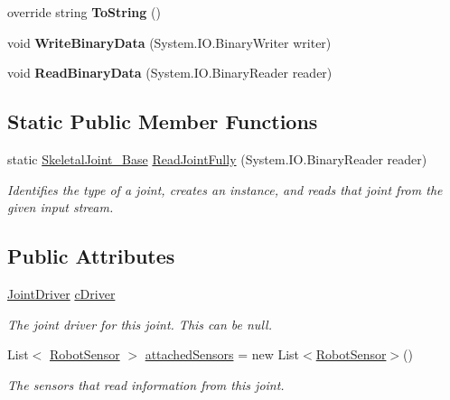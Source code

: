 \begin{DoxyCompactItemize}
\mbox{\label{class_skeletal_joint___base_a0bf3f7cc69c3965e7f3beecc14bec4d0}} 
override string {\bfseries To\+String} ()
\item 
\mbox{\label{class_skeletal_joint___base_a33a745c57346c6d67c52a7ad61816a09}} 
void {\bfseries Write\+Binary\+Data} (System.\+I\+O.\+Binary\+Writer writer)
\item 
\mbox{\label{class_skeletal_joint___base_acf7787e56af14f0919e1d76008b6a19c}} 
void {\bfseries Read\+Binary\+Data} (System.\+I\+O.\+Binary\+Reader reader)
\end{DoxyCompactItemize}
\subsection*{Static Public Member Functions}
\begin{DoxyCompactItemize}
\item 
static \hyperlink{class_skeletal_joint___base}{Skeletal\+Joint\+\_\+\+Base} \hyperlink{class_skeletal_joint___base_ae9f8e31a56644eb92cb901a4587a3d24}{Read\+Joint\+Fully} (System.\+I\+O.\+Binary\+Reader reader)
\begin{DoxyCompactList}\small\item\em Identifies the type of a joint, creates an instance, and reads that joint from the given input stream. \end{DoxyCompactList}\end{DoxyCompactItemize}
\subsection*{Public Attributes}
\begin{DoxyCompactItemize}
\item 
\hyperlink{class_joint_driver}{Joint\+Driver} \hyperlink{class_skeletal_joint___base_a69a85fe8ff6cee4d5773884798300fcf}{c\+Driver}
\begin{DoxyCompactList}\small\item\em The joint driver for this joint. This can be null. \end{DoxyCompactList}\item 
List$<$ \hyperlink{class_robot_sensor}{Robot\+Sensor} $>$ \hyperlink{class_skeletal_joint___base_aaeb09af11a9640ec8d144f825f56c81a}{attached\+Sensors} = new List$<$\hyperlink{class_robot_sensor}{Robot\+Sensor}$>$()
\begin{DoxyCompactList}\small\item\em The sensors that read information from this joint. \end{DoxyCompactList}\end{DoxyCompactItemize}
